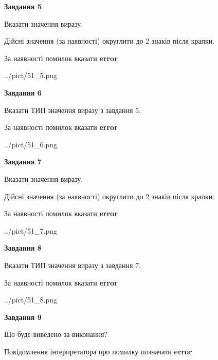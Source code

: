 \documentclass[11pt, ukrainian]{article}
\begin{document}
{\begin {large}
{\begin {center}\textbf{Завдання 5}\end {center}}\par
Вказати значення виразу. \par
Дійсні значення (за наявності) округлити до 2 знаків після крапки. \par
За наявності помилок вказати \textbf{error}

\begin{center}
	{../pict/51_5.png}
\end{center}
\newpage

{\begin {center}\textbf{Завдання 6}\end {center}}\par
Вказати ТИП значення виразу з завдання 5. \par
За наявності помилок вказати \textbf{error}

\begin{center}
	{../pict/51_6.png}
\end{center}
\newpage

{\begin {center}\textbf{Завдання 7}\end {center}}\par
Вказати значення виразу. \par
Дійсні значення (за наявності) округлити до 2 знаків після крапки. \par
За наявності помилок вказати \textbf{error}

\begin{center}
	{../pict/51_7.png}
\end{center}
\newpage

{\begin {center}\textbf{Завдання 8}\end {center}}\par
Вказати ТИП значення виразу з завдання 7. \par
За наявності помилок вказати \textbf{error}

\begin{center}
	{../pict/51_8.png}
\end{center}
\newpage

{\begin {center}\textbf{Завдання 9}\end {center}}\par
Що буде виведено за виконання? \par
Повідомлення інтерпретатора про помилку позначати \textbf{error}


\end{large}}
\end{document}
